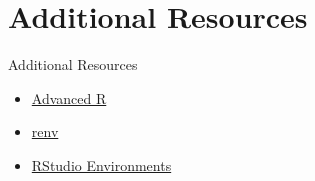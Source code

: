 \documentclass[aspectratio=169]{beamer}
\begin{document}
\section{Additional Resources}

\begin{frame}{Additional Resources}
\begin{itemize}
\item \href{https://adv-r.hadley.nz/index.html}{Advanced R}
\item \href{https://rstudio.github.io/renv/index.html}{renv}
\item \href{https://environments.rstudio.com}{RStudio Environments}
\end{itemize}
\end{frame}


\end{document}
